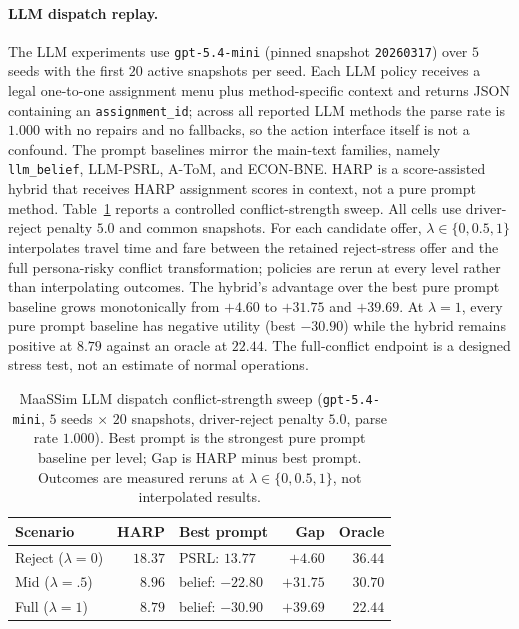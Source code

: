 \paragraph{LLM dispatch replay.}
The LLM experiments use \texttt{gpt-5.4-mini} (pinned snapshot \texttt{20260317}) over $5$ seeds with the first $20$ active snapshots per seed. Each LLM policy receives a legal one-to-one assignment menu plus method-specific context and returns JSON containing an \texttt{assignment\_id}; across all reported LLM methods the parse rate is $1.000$ with no repairs and no fallbacks, so the action interface itself is not a confound. The prompt baselines mirror the main-text families, namely \texttt{llm\_belief}, LLM-PSRL, A-ToM, and ECON-BNE. HARP is a score-assisted hybrid that receives HARP assignment scores in context, not a pure prompt method. Table~\ref{tab:maassim-scenarios} reports a controlled conflict-strength sweep. All cells use driver-reject penalty $5.0$ and common snapshots. For each candidate offer, $\lambda\in\{0,0.5,1\}$ interpolates travel time and fare between the retained reject-stress offer and the full persona-risky conflict transformation; policies are rerun at every level rather than interpolating outcomes. The hybrid's advantage over the best pure prompt baseline grows monotonically from $+4.60$ to $+31.75$ and $+39.69$. At $\lambda=1$, every pure prompt baseline has negative utility (best $-30.90$) while the hybrid remains positive at $8.79$ against an oracle at $22.44$. The full-conflict endpoint is a designed stress test, not an estimate of normal operations.

\begin{table}[t]
\centering
\scriptsize
\setlength{\tabcolsep}{3pt}
\begin{tabular}{@{}lrlrr@{}}
\toprule
Scenario & HARP & Best prompt & Gap & Oracle \\
\midrule
Reject ($\lambda=0$) & $18.37$ & PSRL: $13.77$ & $+4.60$ & $36.44$ \\
Mid ($\lambda=.5$) & $8.96$ & belief: $-22.80$ & $+31.75$ & $30.70$ \\
Full ($\lambda=1$) & $\mathbf{8.79}$ & belief: $-30.90$ & $+39.69$ & $22.44$ \\
\bottomrule
\end{tabular}
\caption{MaaSSim LLM dispatch conflict-strength sweep (\texttt{gpt-5.4-mini}, $5$ seeds $\times$ $20$ snapshots, driver-reject penalty $5.0$, parse rate $1.000$). Best prompt is the strongest pure prompt baseline per level; Gap is HARP minus best prompt. Outcomes are measured reruns at $\lambda\in\{0,0.5,1\}$, not interpolated results.}
\label{tab:maassim-scenarios}
\end{table}

